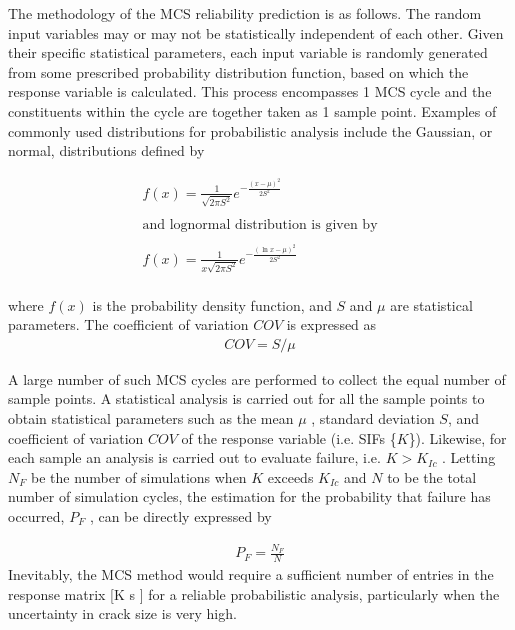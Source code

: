 \documentclass[12pt]{article}
\begin{document}
The methodology of the MCS reliability prediction is as follows. The random input variables may or may not be statistically 
independent of each other. Given their specific statistical parameters, each input variable is randomly generated from
some prescribed probability distribution function, based on which the response variable is calculated. This process encompasses 1 MCS 
cycle and the constituents within the cycle are together taken as 1 sample point. Examples of commonly used
distributions for probabilistic analysis include the Gaussian, or normal, distributions defined by


\begin{align*}
    f(x) = \frac{1}{\sqrt{2 \pi S^2}}e^{-\frac{(x - \mu )^2}{2 S^2}}\\~\\
\text{and lognormal distribution is given by}\\~\\
    f(x) = \frac{1}{x\sqrt{2 \pi S^2}}e^{-\frac{(\ln x - \mu )^2}{2 S^2}}\\ \tag{28}
\end{align*}

where $f(x)$ is the probability density function, and $S$ and $\mu$ are statistical parameters. The coefficient of variation $COV$ is expressed as
\begin{align*}
    COV = S/\mu \tag{29}
\end{align*}

A large number of such MCS cycles are performed to collect the equal number of sample points. A statistical analysis is 
carried out for all the sample points to obtain statistical parameters such as the mean $\mu$ , standard deviation $S$, and coefficient of
variation $COV$ of the response variable (i.e. SIFs \{$K$\}). Likewise, for each sample an analysis is carried out to evaluate failure,
i.e. $K > K_{Ic}$ . Letting $N_F$ be the number of simulations when $K$ exceeds $K_{Ic}$ and $N$ to be the total number of simulation cycles, the
estimation for the probability that failure has occurred, $P_F$ , can be directly expressed by

\begin{align*}
    P_F = \frac{N_F}{N} \tag{30}
\end{align*}
Inevitably, the MCS method would require a sufficient number of entries in the response matrix [K s ] for a reliable 
probabilistic analysis, particularly when the uncertainty in crack size is very high.
\end{document}
